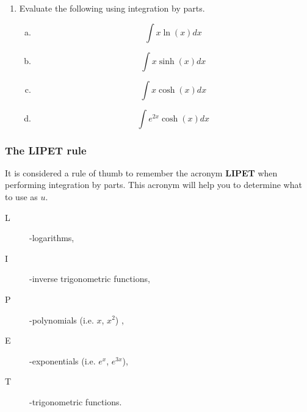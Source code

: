 \documentclass[a4paper,12pt]{article}
\begin{document}
\begin{enumerate}
\begin{multicols}{2}
	\begin{enumerate}[(a)]
		\item \[ \int  xe^{4x} dx. \]
		
		\item \[ \int x \cos(x) dx \]
		
		\item \[ \int  3xe^{3x} \;dx. \]
		
		
		\item \[ \displaystyle{\int xe^xdx}\]
		
	\end{enumerate}
\end{multicols}			
\item Evaluate the following using integration by parts.



\begin{multicols}{2}
	\begin{enumerate}[(a)]		
			\item \[ \displaystyle{\int x \ln(x) dx}\]
	
	\item \[\displaystyle{\int x \sinh(x) dx}\]
	

	
	\item \[\displaystyle{\int x \cosh(x) dx}\]
	
	\item \[\displaystyle{\int e^{2x} \cosh(x)dx}\]
	\end{enumerate}
\end{multicols}	


	

\end{enumerate}
\newpage
\subsubsection*{The LIPET rule}
It is considered a rule of thumb to remember the acronym \textbf{LIPET}
when performing integration by parts. This acronym will help you to determine
what to use as $u$. 


\begin{description}
	\item[L]-logarithms, 
	\item[I]-inverse trigonometric functions,
	\item[P]-polynomials (i.e. $x$, $x^2$) , 
	\item[E]-exponentials (i.e. $e^x$, $e^{3x}$), 
	\item[T]-trigonometric functions.
\end{description}
\end{document}
